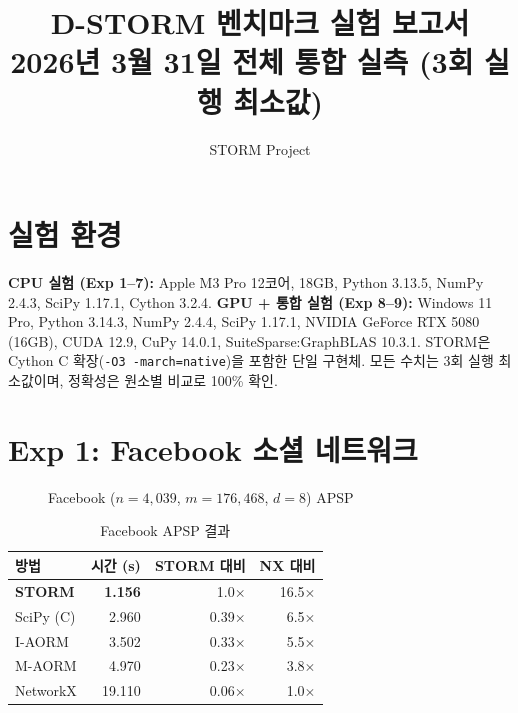 \documentclass[11pt,a4paper]{article}
\title{\Large\textbf{D-STORM 벤치마크 실험 보고서} \\[0.3em]
  \large 2026년 3월 31일 전체 통합 실측 (3회 실행 최소값)}
\author{STORM Project}
\date{}
\begin{document}
\maketitle

\section{실험 환경}
\textbf{CPU 실험 (Exp 1--7):} Apple M3 Pro 12코어, 18GB, Python 3.13.5, NumPy 2.4.3, SciPy 1.17.1, Cython 3.2.4.
\textbf{GPU + 통합 실험 (Exp 8--9):} Windows 11 Pro, Python 3.14.3, NumPy 2.4.4, SciPy 1.17.1, NVIDIA GeForce RTX 5080 (16GB), CUDA 12.9, CuPy 14.0.1, SuiteSparse:GraphBLAS 10.3.1.
STORM은 Cython C 확장(\texttt{-O3 -march=native})을 포함한 단일 구현체.
모든 수치는 3회 실행 최소값이며, 정확성은 원소별 비교로 100\% 확인.

\section{Exp 1: Facebook 소셜 네트워크}

\begin{figure}[ht]
\centering
{}
\caption{Facebook ($n\!=\!4{,}039$, $m\!=\!176{,}468$, $d\!=\!8$) APSP}
\label{fig:fb}
\end{figure}

\begin{table}[ht]\centering
\caption{Facebook APSP 결과}
\begin{tabular}{@{}lrrr@{}}
\toprule
\textbf{방법} & \textbf{시간 (s)} & \textbf{STORM 대비} & \textbf{NX 대비} \\
\midrule
\textbf{STORM} & \textbf{1.156} & 1.0$\times$ & 16.5$\times$ \\
SciPy (C) & 2.960 & 0.39$\times$ & 6.5$\times$ \\
I-AORM & 3.502 & 0.33$\times$ & 5.5$\times$ \\
M-AORM & 4.970 & 0.23$\times$ & 3.8$\times$ \\
NetworkX & 19.110 & 0.06$\times$ & 1.0$\times$ \\
\bottomrule
\end{tabular}
\end{table}
\end{document}
